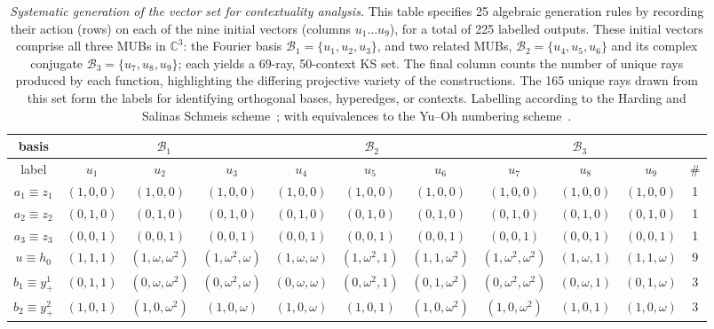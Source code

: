 \documentclass[%
  reprint,
  superscriptaddress,
  showpacs,
  showkeys,
  amsmath,amssymb,
  pra,
  longbibliography,
  floatfix,
  x11names
]{revtex4-2}
\newcommand{\rev}[1]{{\color{revisionblue}#1}}
\begin{document}
\begin{table}[htbp]
\caption{\label{tab:vector_generation}
\textit{Systematic generation of the vector set for contextuality analysis.}
\rev{This table specifies 25 algebraic generation rules by recording their action (rows) on each of the nine initial vectors (columns $u_1\ldots u_9$), for a total of 225 labelled outputs.}
These initial vectors comprise all three MUBs in $\mathbb{C}^3$:
the Fourier basis $\mathcal{B}_1 = \{u_1, u_2, u_3\}$,
and two related MUBs,
$\mathcal{B}_2 = \{u_4, u_5, u_6\}$ and its complex conjugate $\mathcal{B}_3 = \{u_7, u_8, u_9\}$; \rev{each yields a 69-ray, 50-context KS set.}
The final column counts the number of unique rays produced by each function,
highlighting the differing projective variety of the constructions.
The 165 unique rays drawn from this set form the labels for identifying orthogonal bases, hyperedges, or contexts.
Labelling according to the Harding and Salinas Schmeis scheme~\cite{harding2025remarksIJTP};
with equivalences to the Yu--Oh numbering scheme~\cite{Yu-2012}.
}
\begin{ruledtabular}
\begin{tabular}{ccccccccccc}
basis&
      \multicolumn{3}{c|}{$\mathcal{B}_1$}&
      \multicolumn{3}{c|}{$\mathcal{B}_2$}&
      \multicolumn{3}{c}{$\mathcal{B}_3$}\\
\hline
label & $u_{1}$ & $u_{2}$ & $u_{3}$ & $u_{4}$ & $u_{5}$ & $u_{6}$ & $u_{7}$ & $u_{8}$ & $u_{9}$ & \#  \\ \hline
$a_1\equiv z_1$ & $(1,0,0)$ & $(1,0,0)$ & $(1,0,0)$ & $(1,0,0)$ & $(1,0,0)$ & $(1,0,0)$ & $(1,0,0)$ & $(1,0,0)$ & $(1,0,0)$ & 1 \\
$a_2\equiv z_2$ & $(0,1,0)$ & $(0,1,0)$ & $(0,1,0)$ & $(0,1,0)$ & $(0,1,0)$ & $(0,1,0)$ & $(0,1,0)$ & $(0,1,0)$ & $(0,1,0)$ & 1 \\
$a_3\equiv z_3$ & $(0,0,1)$ & $(0,0,1)$ & $(0,0,1)$ & $(0,0,1)$ & $(0,0,1)$ & $(0,0,1)$ & $(0,0,1)$ & $(0,0,1)$ & $(0,0,1)$ & 1 \\
$u\equiv h_0$ & $(1,1,1)$ & $(1,\omega,\omega^2)$ & $(1,\omega^2,\omega)$ & $(1,\omega,\omega)$ & $(1,\omega^2,1)$ & $(1,1,\omega^2)$ & $(1,\omega^2,\omega^2)$ & $(1,\omega,1)$ & $(1,1,\omega)$ & 9 \\
$b_1\equiv y_+^1$ & $(0,1,1)$ & $(0,\omega,\omega^2)$ & $(0,\omega^2,\omega)$ & $(0,\omega,\omega)$ & $(0,\omega^2,1)$ & $(0,1,\omega^2)$ & $(0,\omega^2,\omega^2)$ & $(0,\omega,1)$ & $(0,1,\omega)$ & 3 \\
$b_2\equiv y_+^2$ & $(1,0,1)$ & $(1,0,\omega^2)$ & $(1,0,\omega)$ & $(1,0,\omega)$ & $(1,0,1)$ & $(1,0,\omega^2)$ & $(1,0,\omega^2)$ & $(1,0,1)$ & $(1,0,\omega)$ & 3 \\

\end{tabular}
\end{ruledtabular}
\end{table}
\end{document}
